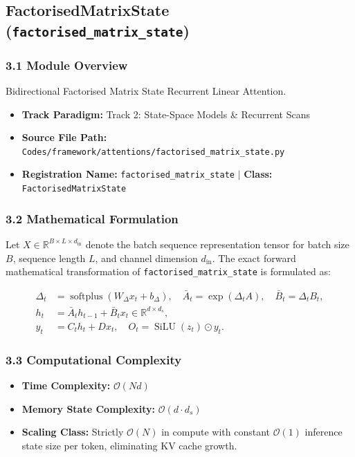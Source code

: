 \subsection{FactorisedMatrixState (\texttt{factorised\_matrix\_state})}
\label{sec:app_module_factorised_matrix_state}

\subsubsection*{3.1 Module Overview}
Bidirectional Factorised Matrix State Recurrent Linear Attention.
\begin{itemize}
    \item \textbf{Track Paradigm:} Track 2: State-Space Models \& Recurrent Scans
    \item \textbf{Source File Path:} \texttt{Codes/framework/attentions/factorised\_matrix\_state.py}
    \item \textbf{Registration Name:} \texttt{factorised\_matrix\_state} $\mid$ \textbf{Class:} \texttt{FactorisedMatrixState}
\end{itemize}

\subsubsection*{3.2 Mathematical Formulation}
Let $X \in \mathbb{R}^{B \times L \times d_{\text{in}}}$ denote the batch sequence representation tensor for batch size $B$, sequence length $L$, and channel dimension $d_{\text{in}}$. The exact forward mathematical transformation of \texttt{factorised\_matrix\_state} is formulated as:

\begin{align}
\Delta_t &= \operatorname{softplus}(W_\Delta x_t + b_\Delta), \quad \bar{A}_t = \exp(\Delta_t A), \quad \bar{B}_t = \Delta_t B_t, \\
h_t &= \bar{A}_t h_{t-1} + \bar{B}_t x_t \in \mathbb{R}^{d \times d_s}, \\
y_t &= C_t h_t + D x_t, \quad O_t = \operatorname{SiLU}(z_t) \odot y_t.
\end{align}


\subsubsection*{3.3 Computational Complexity}
\begin{itemize}
    \item \textbf{Time Complexity:} $\mathcal{O}(N d)$
    \item \textbf{Memory State Complexity:} $\mathcal{O}(d \cdot d_s)$
    \item \textbf{Scaling Class:} Strictly $\mathcal{O}(N)$ in compute with constant $\mathcal{O}(1)$ inference state size per token, eliminating KV cache growth.
\end{itemize}

